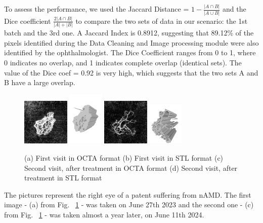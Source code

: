 \documentclass[conference]{IEEEtran}
\begin{document}
To assess the performance, we used the Jaccard Distance = $1- \frac{|A \cap B|}{|A \cup B|}$ and the Dice coefficient  $\frac{2 |A \cap B|}{|A| + |B|}$ to compare the two sets of data in our scenario: the 1st batch and the 3rd one. 
A Jaccard Index is 0.8912, suggesting that 89.12\% of the pixels identified during the Data Cleaning and Image processing module were also identified by the ophthalmologist. 
The Dice Coefficient ranges from 0 to 1, where 0 indicates no overlap, and 1 indicates complete overlap (identical sets). The value of the Dice coef = 0.92 is very high, which suggests that the two sets A and B have a large overlap.
\begin{figure}%
    \centering
    \includegraphics[width=0.2\textwidth]{fig/first_visit.png}
    \includegraphics[width=0.15\textwidth]{fig/visit1.png}
    \includegraphics[width=0.2\textwidth]{fig/second_visit.png}
    \includegraphics[width=0.15\textwidth]{fig/visit2.png}
    \caption{(a) First visit in OCTA format (b) First visit in STL format (c) Second visit, after treatment in OCTA format (d) Second visit, after treatment in STL format}
    \label{fig:visits}
\end{figure}

The pictures represent the right eye of a patent suffering from nAMD. The first image - (a) from Fig. ~\ref{fig:visits}  - was taken on June 27th 2023 and the second one - (c) from Fig. ~\ref{fig:visits}  - was taken almost a year later, on June 11th 2024.
\end{document}
